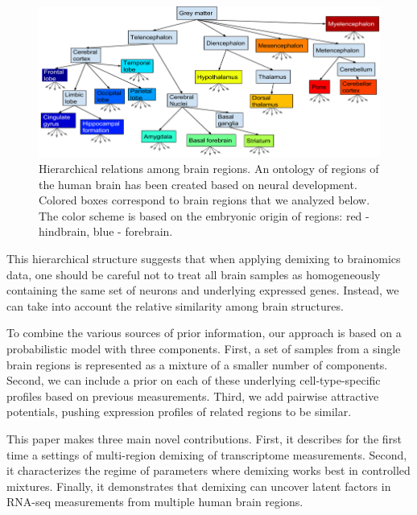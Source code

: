 \documentclass{article} %
\begin{document}
\begin{figure}[!hbt]
  \begin{minipage}[c]{0.65\textwidth}
    \includegraphics[width=\textwidth]{tree}
  \end{minipage}\hfill
  \begin{minipage}[c]{0.3\textwidth}
    \caption{Hierarchical relations among brain regions. An ontology of regions of the human brain has been created based on neural development. Colored boxes correspond to brain regions that we analyzed below. The color scheme is based on the embryonic origin of regions: red - hindbrain, blue - forebrain.} 
    \label{fig:bro}
  \end{minipage}
\end{figure}

This hierarchical structure suggests that when applying demixing to brainomics data, one should be careful not to treat all brain samples as homogeneously containing the same set of neurons and underlying expressed genes. Instead, we can take into account the relative similarity among brain structures. 

To combine the various sources of prior information, our approach is based on a probabilistic model with three components. First, a set of samples from a single brain regions is represented as a mixture of a smaller number of components. Second, we can include a prior on each of these underlying cell-type-specific profiles based on previous measurements. Third, we add pairwise attractive potentials, pushing expression profiles of related regions to be similar.
 
 

 
 
This paper makes three main novel contributions. First, it describes for the first time a settings of multi-region demixing of transcriptome measurements. Second, it characterizes the regime of parameters where demixing works best in controlled mixtures. Finally, it demonstrates that demixing can uncover latent factors in RNA-seq measurements from multiple human brain regions.
 
\end{document}

